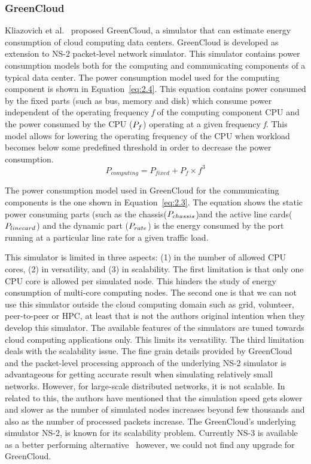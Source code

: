 \subsubsection{GreenCloud}
Kliazovich et al.~\cite{DBLP:journals/tjs/KliazovichBK12} proposed GreenCloud, a simulator that can estimate energy consumption of cloud computing data centers. GreenCloud is developed as extension to NS-2 packet-level network simulator. This simulator contains power consumption models both for the computing and communicating components of a typical data center. The power consumption model used for the computing component is shown in Equation~\ref{eq:2.4}. This equation contains power consumed by the fixed parts (such as bus, memory and disk) which consume power independent of the operating frequency \emph{f} of the computing component CPU and the power consumed by the CPU (\($$P_f$$\)) operating at a given frequency \emph{f}. This model allows for lowering the operating frequency of the CPU when workload becomes below some predefined threshold in order to decrease the power consumption. 
\begin{equation} \label{eq:2.4}
P_{computing} = P_{fixed} + P_f \times f^3
\end{equation}

The power consumption model used in GreenCloud for the communicating components is the one shown in Equation~\ref{eq:2.3}. The equation shows the static power consuming parts (such as the chassis(\($$P_{chassis}$$\))and the active line cards(\($$P_{linecard}$$\)) and the dynamic part (\($$P_{rate}$$\)) is the energy consumed by the port running at a particular line rate for a given traffic load. 

This simulator is limited in three aspects: (1) in the number of allowed CPU cores, (2) in versatility, and (3) in scalability. The first limitation is that only one CPU core is allowed per simulated node. This hinders the study of energy consumption of multi-core computing nodes. The second one is that we can not use this simulator outside the cloud computing domain such as grid, volunteer, peer-to-peer or HPC, at least that is not the authors original intention when they develop this simulator. The available features of the simulators are tuned towards cloud computing applications only. This limits its versatility. The third limitation deals with the scalability issue. The fine grain details provided by GreenCloud and the packet-level processing approach of the underlying NS-2 simulator is advantageous for getting accurate result when simulating relatively small networks. However, for large-scale distributed networks, it is not scalable. In related to this, the authors have mentioned that the simulation speed gets slower and slower as the number of simulated nodes increases beyond few thousands and also as the number of processed packets increase. The GreenCloud's underlying simulator NS-2, is known for its scalability problem. Currently NS-3 is available as a better performing alternative~\cite{DBLP:conf/icc/WeingartnerLW09} however, we could not find any upgrade for GreenCloud.


